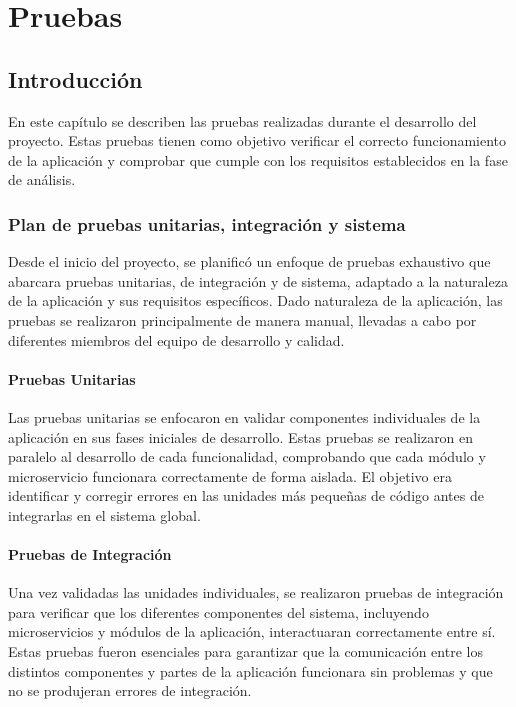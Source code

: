 \chapter{Pruebas}
\label{chap:pruebas}

\section{Introducción}
\label{sec:introduccion_pruebas}

En este capítulo se describen las pruebas realizadas durante el desarrollo del proyecto. Estas pruebas tienen como
objetivo verificar el correcto funcionamiento de la aplicación y comprobar que cumple con los requisitos establecidos
en la fase de análisis. 

\subsection{Plan de pruebas unitarias, integración y sistema}
\label{subsec:plan_pruebas}

Desde el inicio del proyecto, se planificó un enfoque de pruebas exhaustivo que abarcara pruebas unitarias, 
de integración y de sistema, adaptado a la naturaleza de la aplicación y sus requisitos específicos. Dado naturaleza
de la aplicación, las pruebas se realizaron principalmente de manera manual, llevadas a 
cabo por diferentes miembros del equipo de desarrollo y calidad.

\subsubsection{Pruebas Unitarias}
Las pruebas unitarias se enfocaron en validar componentes individuales de la aplicación en sus fases iniciales de desarrollo. 
Estas pruebas se realizaron en paralelo al desarrollo de cada funcionalidad, comprobando que cada módulo y microservicio funcionara 
correctamente de forma aislada. El objetivo era identificar y corregir errores en las unidades más pequeñas de código antes de 
integrarlas en el sistema global.

\subsubsection{Pruebas de Integración}
Una vez validadas las unidades individuales, se realizaron pruebas de integración para verificar que los diferentes componentes 
del sistema, incluyendo microservicios y módulos de la aplicación, interactuaran correctamente entre sí. Estas pruebas fueron 
esenciales para garantizar que la comunicación entre los distintos componentes y partes de la aplicación funcionara sin problemas
y que no se produjeran errores de integración. 


